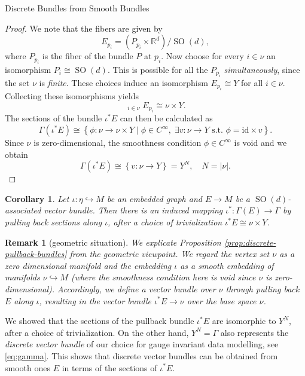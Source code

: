 \documentclass[10pt,reqno]{amsart}
\numberwithin{equation}{section}
\theoremstyle{bfnote}
\newtheorem{corollary}[theorem]{Corollary}
\theoremstyle{bfdef}
\newtheorem{remark}[theorem]{Remark}
\newcommand{\R}{\mathbb{R}}
\DeclareMathOperator{\SO}{SO}
\begin{document}
\begin{subsection}{Discrete Bundles from Smooth Bundles}
	\begin{proof}
		We note that the fibers are given by
		\begin{equation}
			E_{p_{i}} = (P_{p_{i}} \times \R^d) / \SO(d),
		\end{equation}
		where $P_{p_{i}}$ is the fiber of the bundle $P$ at $p_i$.
		Now choose for every $i \in \nu$ an isomorphism $P_i \cong \SO(d)$. This is possible for all the $P_{p_i}$ \textit{simultaneously}, since the set $\nu$ is \textit{finite}. These choices induce an isomorphism $E_{p_{i}} \cong Y$ for all $i \in \nu$. Collecting these isomorphisms yields
		\begin{equation}
			\mathop{\dot{\bigcup}}_{i \in \nu} E_{p_{i}} \cong \nu \times Y.
		\end{equation}
		The sections of the bundle $\iota^{*}E$ can then be calculated as
		\begin{equation}
			\Gamma(\iota^{*}E) \cong
			\left\{ \phi : \nu \to \nu \times Y \mid \phi \in C^{\infty}, \; \exists v : \nu \to Y \text{ s.t. } \phi = \mathrm{id} \times v \right\}.
		\end{equation}
		Since $\nu$ is zero-dimensional, the smoothness condition $\phi \in C^{\infty}$ is void and we obtain
		\begin{equation}
			\Gamma(\iota^{*}E) \cong \left\{ v : \nu \to Y \right\} = Y^N, \quad N = |\nu|.
		\end{equation}
	\end{proof}

	\begin{corollary}
		Let $\iota : \eta \hookrightarrow M$ be an embedded graph and $E \to M$ be a $\SO(d)$-associated vector bundle. Then there is an induced mapping $\iota^{*} : \Gamma(E) \to \Gamma$ by pulling back sections along $\iota$, after a choice of trivialization $\iota^{*}E \cong \nu \times Y$.
	\end{corollary}

	\begin{remark}[geometric situation]
	We explicate Proposition \ref{prop:discrete-pullback-bundles} from the geometric viewpoint. 
		We regard the vertex set $\nu$ as a zero dimensional manifold and the embedding $\iota$ as a smooth embedding of manifolds $\nu \hookrightarrow M$ (where the smoothness condition here is void since $\nu$ is zero-dimensional).
		Accordingly, we define a vector bundle over $\nu$ through pulling back $E$ along $\iota$, resulting in the vector bundle $\iota^{*}E \to \nu$ over the base space $\nu$.
	\end{remark}
	We showed that the sections of the pullback bundle $\iota^*E$ are isomorphic to $Y^N$, after a choice of trivialization. On the other hand, $Y^N = \Gamma$ also represents the \textit{discrete vector bundle} of our choice for gauge invariant data modelling, see \eqref{eq:gamma}. This shows that discrete vector bundles can be obtained from smooth ones $E$ in terms of the sections of $\iota^*E$. 


\end{subsection}
\end{document}
